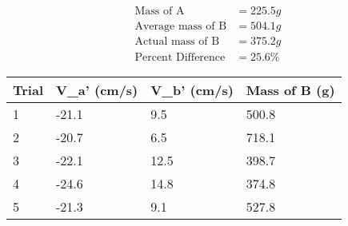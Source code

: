 \begin{equation*}
    \begin{aligned}
        \text{Mass of A}&=225.5g \\
        \text{Average mass of B}&=504.1g \\
        \text{Actual mass of B}&=375.2g \\
        \text{Percent Difference}&=25.6\%
    \end{aligned}    
\end{equation*}
\begin{table}[H]
    \begin{tabular}{|l|l|l|l|}
    \hline
    Trial & V\_a' (cm/s) & V\_b' (cm/s) & Mass of B (g) \\ \hline
    1     & -21.1        & 9.5          & 500.8         \\ \hline
    2     & -20.7        & 6.5          & 718.1         \\ \hline
    3     & -22.1        & 12.5         & 398.7         \\ \hline
    4     & -24.6        & 14.8         & 374.8         \\ \hline
    5     & -21.3        & 9.1          & 527.8         \\ \hline
    \end{tabular}
    \end{table}
    